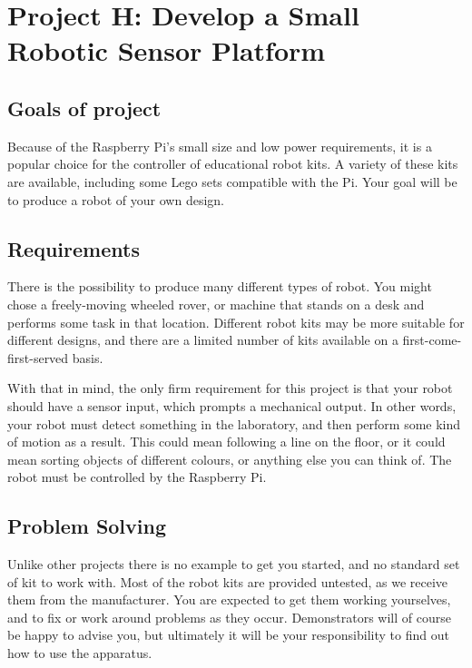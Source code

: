 

\newpage
\section{Project H: Develop a Small Robotic Sensor Platform}

\subsection{Goals of project}

Because of the Raspberry Pi's small size and low power requirements, it is a popular choice for the controller of educational robot kits.
A variety of these kits are available, including some Lego sets compatible with the Pi.
Your goal will be to produce a robot of your own design.

\subsection{Requirements}

There is the possibility to produce many different types of robot.
You might chose a freely-moving wheeled rover, or machine that stands on a desk and performs some task in that location.
Different robot kits may be more suitable for different designs, and there are a limited number of kits available on a first-come-first-served basis.

With that in mind, the only firm requirement for this project is that your robot should have a sensor input, which prompts a mechanical output.
In other words, your robot must detect something in the laboratory, and then perform some kind of motion as a result.
This could mean following a line on the floor, or it could mean sorting objects of different colours, or anything else you can think of.
The robot must be controlled by the Raspberry Pi.

\subsection{Problem Solving}

Unlike other projects there is no example to get you started, and no standard set of kit to work with.
Most of the robot kits are provided untested, as we receive them from the manufacturer.
You are expected to get them working yourselves, and to fix or work around problems as they occur.
Demonstrators will of course be happy to advise you, but ultimately it will be your responsibility to find out how to use the apparatus.

